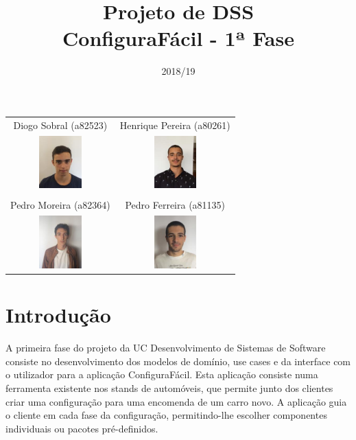 \documentclass[11pt]{article} %
\title{Projeto de DSS \\ \large ConfiguraFácil - 1ª Fase}
\date{2018/19}
\begin{document}
\maketitle

\begin{table}[!htbp]
\centering
\begin{tabular}{cc}
 Diogo Sobral (a82523) &  Henrique Pereira (a80261) \\
 \includegraphics[height=0.8in]{Diogo} &  \includegraphics[height=0.8in]{Henrique} \\
	& \\
 Pedro Moreira (a82364)  &   Pedro Ferreira (a81135) \\
 \includegraphics[height=0.8in]{PedroM} & \includegraphics[height=0.8in]{PedroF} \\

\end{tabular}
\end{table}

\newpage
\tableofcontents
\newpage

\section{Introdução}
A primeira fase do projeto da UC Desenvolvimento de Sistemas de Software consiste no desenvolvimento dos modelos de domínio, use cases e da interface com o utilizador para a aplicação ConfiguraFácil. Esta aplicação consiste numa ferramenta existente nos stands de automóveis, que permite junto dos clientes criar uma configuração para uma encomenda de um carro novo. A aplicação guia o cliente em cada fase da configuração, permitindo-lhe escolher componentes individuais ou pacotes pré-definidos. 
\end{document}
